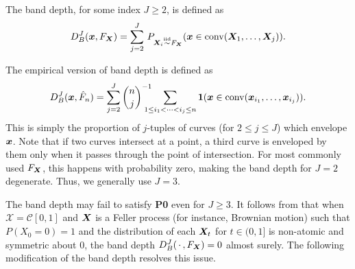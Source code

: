\begin{definition}
    The band depth, for some index $J \geq 2$, is defined as
    \begin{equation}
        D_B^J(\bm{x}, F_{\bm{X}}) = \sum_{j = 2}^J\, P_{\bm{X}_i \overset{\text{iid}}{\sim} F_{\bm{X}}}(\bm{x} \in \operatorname{conv}(\bm{X}_1, \dots, \bm{X}_j)).
    \end{equation}
\end{definition}
The empirical version of band depth is defined as
\begin{equation}
    D_B^J(\bm{x}, \hat{F}_n) = \sum_{j = 2}^J\binom{n}{j}^{-1} \hspace{-1em}\sum_{\substack{1 \leq i_1 < \dots < i_j \leq n}} \bm{1}(\bm{x} \in \operatorname{conv}(\bm{x}_{i_1}, \dots, \bm{x}_{i_j})).
\end{equation}
This is simply the proportion of $j$-tuples of curves (for $2 \leq j \leq J$)
which envelope $\bm{x}$.
Note that if two curves intersect at a point, a third curve is enveloped by
them only when it passes through the point of intersection.
For most commonly used $F_{\bm{X}}$, this happens with probability zero, making
the band depth for $J = 2$ degenerate.
Thus, we generally use $J = 3$.


\begin{remark}
    The band depth may fail to satisfy \textbf{P0} even for $J \geq 3$.
    It follows from \textcite[Theorem~3.2]{chakraborty-chaudhuri-2014a} that
    when $\mathscr{X} = \mathcal{C}[0, 1]$ and $\bm{X}$ is a Feller process (for
    instance, Brownian motion) such that $P(X_0 = 0) = 1$ and the distribution
    of each $\bm{X}_t$ for $t \in (0, 1]$ is non-atomic and symmetric about $0$,
    the band depth $D^J_B(\,\cdot\,, F_{\bm{X}}) = 0$ almost surely.
    The following modification of the band depth resolves this issue.
\end{remark}


